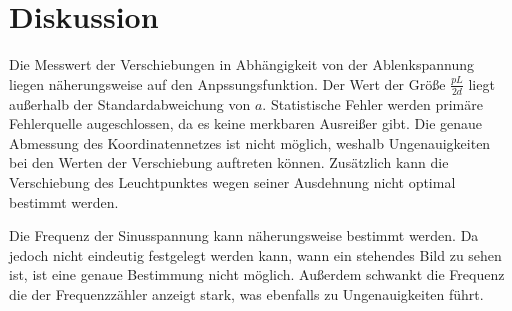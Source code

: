\section{Diskussion}
\label{sec:Diskussion}

Die Messwert der Verschiebungen in Abhängigkeit von der Ablenkspannung liegen näherungsweise auf den Anpssungsfunktion.
Der Wert der Größe $\frac{pL}{2d}$ liegt außerhalb der Standardabweichung von $a$. Statistische Fehler
werden primäre Fehlerquelle augeschlossen, da es keine merkbaren Ausreißer gibt. Die genaue Abmessung
des Koordinatennetzes ist nicht möglich, weshalb Ungenauigkeiten bei den Werten der Verschiebung auftreten können.
Zusätzlich kann die Verschiebung des Leuchtpunktes wegen seiner Ausdehnung nicht optimal bestimmt werden.

Die Frequenz der Sinusspannung kann näherungsweise bestimmt werden. Da jedoch nicht eindeutig
festgelegt werden kann, wann ein stehendes Bild zu sehen ist, ist eine genaue Bestimmung nicht möglich.
Außerdem schwankt die Frequenz die der Frequenzzähler anzeigt stark, was ebenfalls zu Ungenauigkeiten führt.
